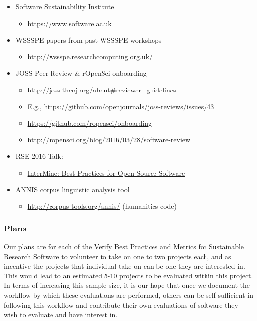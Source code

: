 \begin{itemize}
\item Software Sustainability Institute
\begin{itemize}
\item \url{https://www.software.ac.uk}
\end{itemize}

\item WSSSPE papers from past WSSSPE workshops
\begin{itemize}
\item \url{http://wssspe.researchcomputing.org.uk/}
\end{itemize}

\item JOSS Peer Review & rOpenSci onboarding
\begin{itemize} 
\item \url{http://joss.theoj.org/about#reviewer_guidelines} 
\item E.g., \url{https://github.com/openjournals/joss-reviews/issues/43}
\item \url{https://github.com/ropensci/onboarding}
\item \url{http://ropensci.org/blog/2016/03/28/software-review}
\end{itemize}

\item RSE 2016 Talk:
\begin{itemize}
\item \href{http://www.rse.ac.uk/conf2016_talks#T1.1}{InterMine: Best Practices for Open Source Software}
\end{itemize}

\item ANNIS corpus linguistic analysis tool
\begin{itemize}
\item \url{http://corpus-tools.org/annis/} (humanities code)
\end{itemize}

\end{itemize}


\subsubsection{Plans}

Our plans are for each of the Verify Best Practices and Metrics for Sustainable Research Software to volunteer to take on one to two projects each, and as incentive the projects that individual take on can be one they are interested in.  This would lead to an estimated 5-10 projects to be evaluated within this project.  In terms of increasing this sample size, it is our hope that once we document the workflow by which these evaluations are performed, others can be self-sufficient in following this workflow and contribute their own evaluations of software they wish to evaluate and have interest in.

